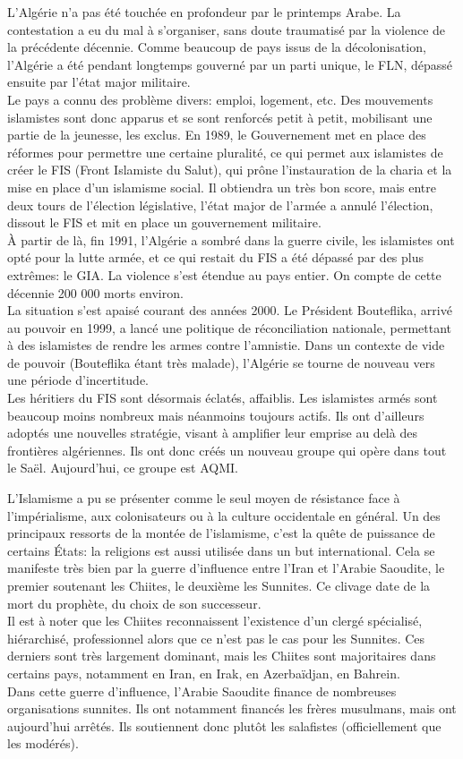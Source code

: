 \documentclass[10pt, a4paper, openany]{book}
\begin{document}
L'Algérie n'a pas été touchée en profondeur par le printemps Arabe. La contestation a eu du mal à s'organiser, sans doute traumatisé par la violence de la précédente décennie. Comme beaucoup de pays issus de la décolonisation, l'Algérie a été pendant longtemps gouverné par un parti unique, le FLN, dépassé ensuite par l'état major militaire. \\
Le pays a connu des problème divers: emploi, logement, etc. Des mouvements islamistes sont donc apparus et se sont renforcés petit à petit, mobilisant une partie de la jeunesse, les exclus. En 1989, le Gouvernement met en place des réformes pour permettre une certaine pluralité, ce qui permet aux islamistes de créer le FIS (Front Islamiste du Salut), qui prône l'instauration de la charia et la mise en place d'un islamisme social. Il obtiendra un très bon score, mais entre deux tours de l'élection législative, l'état major de l'armée a annulé l'élection, dissout le FIS et mit en place un gouvernement militaire. \\
À partir de là, fin 1991, l'Algérie a sombré dans la guerre civile, les islamistes ont opté pour la lutte armée, et ce qui restait du FIS a été dépassé par des plus extrêmes: le GIA. La violence s'est étendue au pays entier. On compte de cette décennie 200 000 morts environ. \\
La situation s'est apaisé courant des années 2000. Le Président Bouteflika, arrivé au pouvoir en 1999, a lancé une politique de réconciliation nationale, permettant à des islamistes de rendre les armes contre l'amnistie. Dans un contexte de vide de pouvoir (Bouteflika étant très malade), l'Algérie se tourne de nouveau vers une période d'incertitude. \\
Les héritiers du FIS sont désormais éclatés, affaiblis. Les islamistes armés sont beaucoup moins nombreux mais néanmoins toujours actifs. Ils ont d'ailleurs adoptés une nouvelles stratégie, visant à amplifier leur emprise au delà des frontières algériennes. Ils ont donc créés un nouveau groupe qui opère dans tout le Saël. Aujourd'hui, ce groupe est AQMI.


L'Islamisme a pu se présenter comme le seul moyen de résistance face à l'impérialisme, aux colonisateurs ou à la culture occidentale en général. Un des principaux ressorts de la montée de l'islamisme, c'est la quête de puissance de certains États: la religions est aussi utilisée dans un but international. Cela se manifeste très bien par la guerre d'influence entre l'Iran et l'Arabie Saoudite, le premier soutenant les Chiites, le deuxième les Sunnites. Ce clivage date de la mort du prophète, du choix de son successeur. \\
Il est à noter que les Chiites reconnaissent l'existence d'un clergé spécialisé, hiérarchisé, professionnel alors que ce n'est pas le cas pour les Sunnites. Ces derniers sont très largement dominant, mais les Chiites sont majoritaires dans certains pays, notamment en Iran, en Irak, en Azerbaïdjan, en Bahrein. \\
Dans cette guerre d'influence, l'Arabie Saoudite finance de nombreuses organisations sunnites. Ils ont notamment financés les frères musulmans, mais ont aujourd'hui arrêtés. Ils soutiennent donc plutôt les salafistes (officiellement que les modérés).
\end{document}
